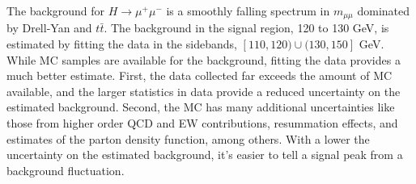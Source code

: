 The background for $H\rightarrow\mu^+\mu^-$ is a smoothly falling spectrum in $m_{\mu\mu}$ dominated by Drell-Yan and $t\bar{t}$. The background in the signal region, 120 to 130 GeV, is estimated by fitting the data in the sidebands, $[110, 120) \cup (130,150]$ GeV. While MC samples are available for the background, fitting the data provides a much better estimate. First, the data collected far exceeds the amount of MC available, and the larger statistics in data provide a reduced uncertainty on the estimated background. Second, the MC has many additional uncertainties like those from higher order QCD and EW contributions, resummation effects, and estimates of the parton density function, among others. With a lower the uncertainty on the estimated background, it's easier to tell a signal peak from a background fluctuation. 

